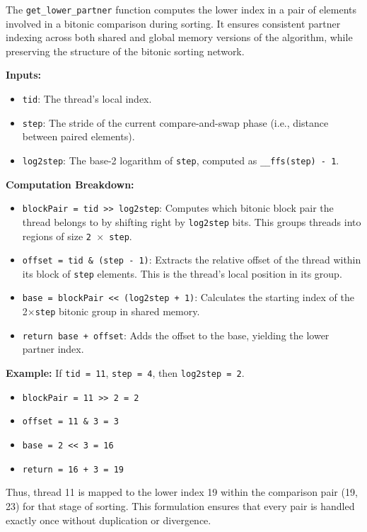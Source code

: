 \documentclass{article}
\begin{document}
\vspace{1em}

\begin{tcolorbox}[title={Understanding \texttt{get\_lower\_partner}}, colback=blue!5!white, 
colframe=blue!75!black, fonttitle=\bfseries, breakable]
The \texttt{get\_lower\_partner} function computes the lower index in a pair of elements involved in a bitonic 
comparison during sorting. It ensures consistent partner indexing across both shared and global memory versions
of the algorithm, while preserving the structure of the bitonic sorting network.

\medskip
\noindent\textbf{Inputs:}
\begin{itemize}
  \item \texttt{tid}: The thread's local index.
  \item \texttt{step}: The stride of the current compare-and-swap phase (i.e., distance between paired elements).
  \item \texttt{log2step}: The base-2 logarithm of \texttt{step}, computed as \texttt{\_\_ffs(step) - 1}.
\end{itemize}

\medskip
\noindent\textbf{Computation Breakdown:}
\begin{itemize}
  \item \texttt{blockPair = tid >> log2step}: Computes which bitonic block pair the thread belongs to by 
  shifting right by \texttt{log2step} bits. This groups threads into regions of size \texttt{2 $\times$ step}.
  \item \texttt{offset = tid \& (step - 1)}: Extracts the relative offset of the thread within its block of 
  \texttt{step} elements. This is the thread’s local position in its group.
  \item \texttt{base = blockPair << (log2step + 1)}: Calculates the starting index of 
  the 2$\times$\texttt{step} bitonic group in shared memory.
  \item \texttt{return base + offset}: Adds the offset to the base, yielding the lower partner index.
\end{itemize}

\medskip
\noindent\textbf{Example:}  
If \texttt{tid = 11}, \texttt{step = 4}, then \texttt{log2step = 2}.  
\begin{itemize}
  \item \texttt{blockPair = 11 >> 2 = 2}
  \item \texttt{offset = 11 \& 3 = 3}
  \item \texttt{base = 2 << 3 = 16}
  \item \texttt{return = 16 + 3 = 19}
\end{itemize}

Thus, thread 11 is mapped to the lower index 19 within the comparison pair (19, 23) for that stage of sorting. 
This formulation ensures that every pair is handled exactly once without duplication or divergence.
\end{tcolorbox}
\end{document}
